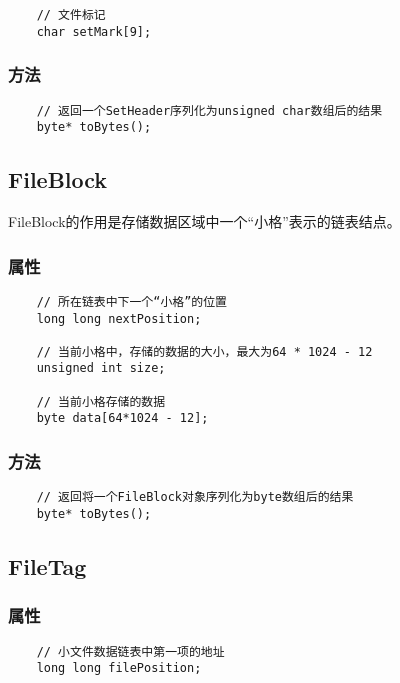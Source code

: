 \documentclass[11pt, a4paper]{article}
\begin{document}
\begin{CJK*}{UTF8}{gbsn}
\begin{lstlisting}
    // 文件标记
    char setMark[9];
  \end{lstlisting}

  \subsubsection{方法}

  \begin{lstlisting}
    // 返回一个SetHeader序列化为unsigned char数组后的结果
    byte* toBytes();
  \end{lstlisting}

  \subsection{FileBlock}

  FileBlock的作用是存储数据区域中一个“小格”表示的链表结点。

  \subsubsection{属性}

  \begin{lstlisting}
    // 所在链表中下一个“小格”的位置
    long long nextPosition;

    // 当前小格中，存储的数据的大小，最大为64 * 1024 - 12
    unsigned int size;

    // 当前小格存储的数据
    byte data[64*1024 - 12];
  \end{lstlisting}

  \subsubsection{方法}

  \begin{lstlisting}
    // 返回将一个FileBlock对象序列化为byte数组后的结果
    byte* toBytes();
  \end{lstlisting}

  \subsection{FileTag}

  \subsubsection{属性}
  
  \begin{lstlisting}
    // 小文件数据链表中第一项的地址
    long long filePosition;


\end{lstlisting}
\end{CJK*}
\end{document}
